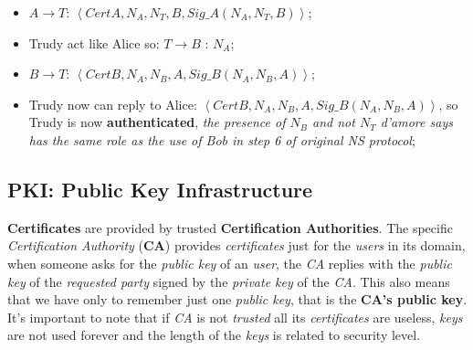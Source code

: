 \documentclass{article}
\begin{document}
\begin{itemize}
\begin{itemize}
\begin{itemize}
\item $A \rightarrow T$: $\left \langle CertA, N_A, N_T, B, Sig\_A(N_A,N_T,B) \right \rangle$;
\item Trudy act like Alice so: $T \rightarrow B$ : $N_A$;
\item $B \rightarrow T$: $\left \langle CertB, N_A, N_B, A, Sig\_B(N_A,N_B,A) \right \rangle$;
\item Trudy now can reply to Alice: $\left \langle CertB, N_A, N_B, A, Sig\_B(N_A,N_B,A) \right \rangle$, so Trudy is now \textbf{authenticated}, \emph{the presence of $N_B$ and not $N_T$ d'amore says has the same role as the use of Bob in step 6 of original NS protocol};
\end{itemize}
\end{itemize}
\end{itemize}
\subsection{PKI: Public Key Infrastructure}
\textbf{Certificates} are provided by trusted \textbf{Certification Authorities}. The specific \emph{Certification Authority} (\textbf{CA}) provides \emph{certificates} just for the \emph{users} in its domain, when someone asks for the \emph{public key} of an \emph{user}, the \emph{CA} replies with the \emph{public key} of the \emph{requested party} signed by the \emph{private key} of the \emph{CA}. This also means that we have only to remember just one \emph{public key}, that is the \textbf{CA’s public key}. It's important to note that if \emph{CA} is not \emph{trusted} all its \emph{certificates} are useless, \emph{keys} are not used forever and the length of the \emph{keys} is related to security level. 
\end{document}
